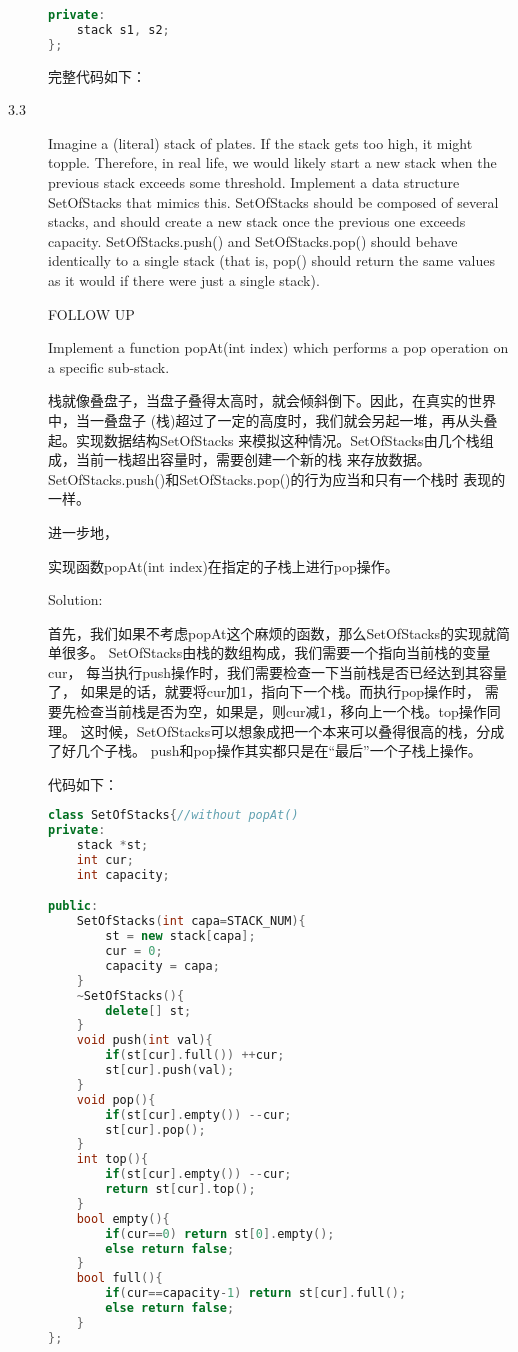 \begin{description}
\begin{lstlisting}[language=C++]
private:
    stack s1, s2;
};
\end{lstlisting}

完整代码如下：




\item[3.3] Imagine a (literal) stack of plates. If the stack gets too high, it might topple. Therefore, in real life, we would likely start a new stack when the previous stack exceeds some threshold. Implement a data structure SetOfStacks that mimics this. SetOfStacks should be composed of several stacks, and should create a new stack once the previous one exceeds capacity. SetOfStacks.push() and SetOfStacks.pop() should behave identically to a single stack (that is, pop() should return the same values as it would if there were just a single stack).

FOLLOW UP

Implement a function popAt(int index) which performs a pop operation on a specific sub-stack.

栈就像叠盘子，当盘子叠得太高时，就会倾斜倒下。因此，在真实的世界中，当一叠盘子 (栈)超过了一定的高度时，我们就会另起一堆，再从头叠起。实现数据结构SetOfStacks 来模拟这种情况。SetOfStacks由几个栈组成，当前一栈超出容量时，需要创建一个新的栈 来存放数据。SetOfStacks.push()和SetOfStacks.pop()的行为应当和只有一个栈时 表现的一样。

进一步地，

实现函数popAt(int index)在指定的子栈上进行pop操作。

Solution: 

首先，我们如果不考虑popAt这个麻烦的函数，那么SetOfStacks的实现就简单很多。 SetOfStacks由栈的数组构成，我们需要一个指向当前栈的变量cur， 每当执行push操作时，我们需要检查一下当前栈是否已经达到其容量了， 如果是的话，就要将cur加1，指向下一个栈。而执行pop操作时， 需要先检查当前栈是否为空，如果是，则cur减1，移向上一个栈。top操作同理。 这时候，SetOfStacks可以想象成把一个本来可以叠得很高的栈，分成了好几个子栈。 push和pop操作其实都只是在“最后”一个子栈上操作。

代码如下：

\begin{lstlisting}[language=C++]
class SetOfStacks{//without popAt()
private:
    stack *st;
    int cur;
    int capacity;

public:
    SetOfStacks(int capa=STACK_NUM){
        st = new stack[capa];
        cur = 0;
        capacity = capa;
    }
    ~SetOfStacks(){
        delete[] st;
    }
    void push(int val){
        if(st[cur].full()) ++cur;
        st[cur].push(val);
    }
    void pop(){
        if(st[cur].empty()) --cur;
        st[cur].pop();
    }
    int top(){
        if(st[cur].empty()) --cur;
        return st[cur].top();
    }
    bool empty(){
        if(cur==0) return st[0].empty();
        else return false;
    }
    bool full(){
        if(cur==capacity-1) return st[cur].full();
        else return false;
    }    
};
\end{lstlisting}


\end{description}
